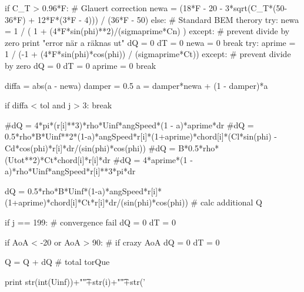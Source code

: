 \begin{pythoncode}
                    if C_T > 0.96*F: # Glauert correction
                        newa = (18*F - 20 - 3*sqrt(C_T*(50-36*F) + 12*F*(3*F - 4))) / (36*F - 50)
                    else: # Standard BEM therory
                        try:
                            newa = 1 / ( 1 + (4*F*sin(phi)**2)/(sigmaprime*Cn) )
                        except: # prevent divide by zero
                            print "error när a räknas ut"
                            dQ = 0
                            dT = 0
                            newa = 0
                            break
                    try:
                        aprime = 1 / (-1 + (4*F*sin(phi)*cos(phi)) / (sigmaprime*Ct))
                    except: # prevent divide by zero
                        dQ = 0
                        dT = 0
                        aprime = 0
                        break


                    diffa = abs(a - newa)
                    damper = 0.5
                    a = damper*newa + (1 - damper)*a

                    if diffa < tol and j > 3:
                        break
                
                #dQ = 4*pi*(r[i]**3)*rho*Uinf*angSpeed*(1 - a)*aprime*dr
                #dQ = 0.5*rho*B*Uinf**2*(1-a)*angSpeed*r[i]*(1+aprime)*chord[i]*(Cl*sin(phi) - Cd*cos(phi)*r[i]*dr/(sin(phi)*cos(phi))
                #dQ = B*0.5*rho*(Utot**2)*Ct*chord[i]*r[i]*dr
                #dQ = 4*aprime*(1 - a)*rho*Uinf*angSpeed*r[i]**3*pi*dr

                dQ = 0.5*rho*B*Uinf*(1-a)*angSpeed*r[i]*(1+aprime)*chord[i]*Ct*r[i]*dr/(sin(phi)*cos(phi)) # calc additional Q
                
                if j == 199: # convergence fail
                    dQ = 0
                    dT = 0

                if AoA < -20 or AoA > 90: # if crazy AoA
                    dQ = 0
                    dT = 0

                Q = Q + dQ # total torQue

                print str(int(Uinf))+"\t"+str(i)+"\t"+str('%




\end{pythoncode}
